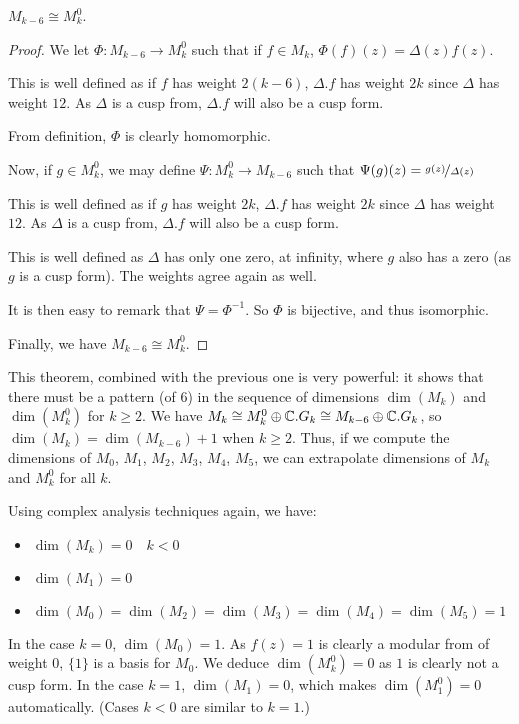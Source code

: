 \begin{theorem}
    $M_{k-6} \cong M_k^0$.\cite[p.88]{CourseInArithmetic}
\end{theorem}
\begin{proof}
    We let $\Phi:M_{k-6} \to M_k^0$ such that if $f \in M_k$, $\Phi(f)(z) = \varDelta(z)f(z)$.
    
    This is well defined as if $f$ has weight $2(k-6)$, $\varDelta.f$ has weight $2k$ since $\varDelta$ has weight $12$. As $\varDelta$ is a cusp from, $\varDelta.f$ will also be a cusp form.
    
    From definition, $\Phi$ is clearly homomorphic.
    
    
    Now, if $g \in M_k^0$, we may define $\Psi: M_k^0 \to M_{k-6}$ such that $\Psi(g)(z) = \nicefrac{g(z)}{\varDelta(z)}$
    
    This is well defined as if $g$ has weight $2k$, $\varDelta.f$ has weight $2k$ since $\varDelta$ has weight $12$. As $\varDelta$ is a cusp from, $\varDelta.f$ will also be a cusp form.
    
    This is well defined as $\varDelta$ has only one zero, at infinity, where $g$ also has a zero (as $g$ is a cusp form). The weights agree again as well.
    
    It is then easy to remark that $\Psi = \Phi^{-1}$. So $\Phi$ is bijective, and thus isomorphic. 
    
    Finally, we have $M_{k-6} \cong M_k^0$.
\end{proof}
This theorem, combined with the previous one is very powerful: it shows that there must be a pattern (of 6) in the sequence of dimensions $\dim(M_k)$ and $\dim(M_k^0)$ for $k \geq 2$.
We have $M_k \cong M_k^0 \oplus \mathbb{C}.G_k \cong M_{k-6} \oplus \mathbb{C}.G_k$, so $\dim(M_k) = \dim(M_{k-6})+1$ when $k \geq 2$.
Thus, if we compute the dimensions of $M_0$, $M_1$, $M_2$, $M_3$, $M_4$, $M_5$, we can extrapolate dimensions of $M_k$ and $M_k^0$ for all $k$.

Using complex analysis techniques again, we have:
\begin{itemize}
    \item $\dim(M_k) = 0 \quad k < 0$
    \item $\dim(M_1) = 0$
    \item $\dim(M_0) = \dim(M_2) = \dim(M_3) = \dim(M_4) = \dim(M_5) = 1$
\end{itemize}
In the case $k=0$, $\dim(M_0) = 1$. As $f(z) = 1$ is clearly a modular from of weight $0$, $\{1\}$ is a basis for $M_0$. We deduce $\dim(M_k^0) = 0$ as $1$ is clearly not a cusp form.
In the case $k=1$, $\dim(M_1) = 0$, which makes $\dim(M_1^0) = 0$ automatically.
(Cases $k<0$ are similar to $k=1$.)

